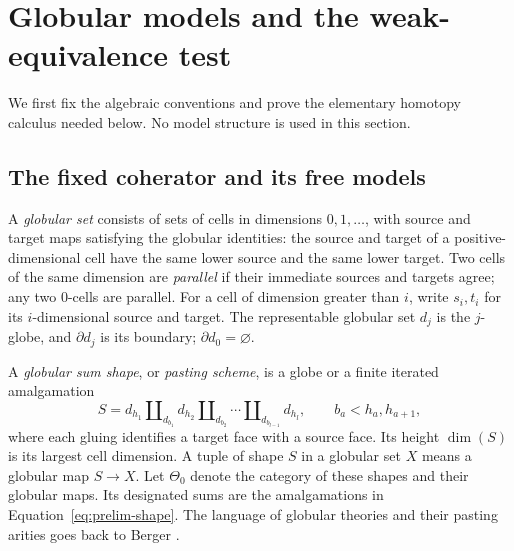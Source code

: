\section{Globular models and the weak-equivalence test}
\label{sec:preliminaries}

We first fix the algebraic conventions and prove the elementary homotopy
calculus needed below.  No model structure is used in this section.

\subsection{The fixed coherator and its free models}

A \emph{globular set} consists of sets of cells in dimensions
$0,1,\ldots$, with source and target maps satisfying the globular identities:
the source and target of a positive-dimensional cell have the same lower
source and the same lower target.  Two cells of the same dimension are
\emph{parallel} if their immediate sources and targets agree; any two
$0$-cells are parallel.  For a cell of dimension greater than $i$, write
$s_i,t_i$ for its $i$-dimensional source and target.  The representable
globular set $d_j$ is the $j$-globe, and $\partial d_j$ is its boundary;
$\partial d_0=\varnothing$.

A \emph{globular sum shape}, or \emph{pasting scheme}, is a globe or a
finite iterated amalgamation
\begin{equation}\label{eq:prelim-shape}
 S=d_{h_1}\amalg_{d_{b_1}}d_{h_2}
       \amalg_{d_{b_2}}\cdots\amalg_{d_{b_{l-1}}}d_{h_l},
 \qquad b_a<h_a,h_{a+1},
\end{equation}
where each gluing identifies a target face with a source face.  Its height
$\dim(S)$ is its largest cell dimension.  A tuple of shape $S$ in a
globular set $X$ means a globular map $S\to X$.  Let $\Theta_0$ denote the
category of these shapes and their globular maps.  Its designated sums are
the amalgamations in Equation~\eqref{eq:prelim-shape}.  The language of
globular theories and their pasting arities goes back to
Berger \cite[Definition~1.5]{Berger2002}.

